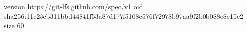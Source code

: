 version https://git-lfs.github.com/spec/v1
oid sha256:11c23cb311bbd44841f53a87d177f5108c576f72978b97aa9f2b0b088e8e15e2
size 60
